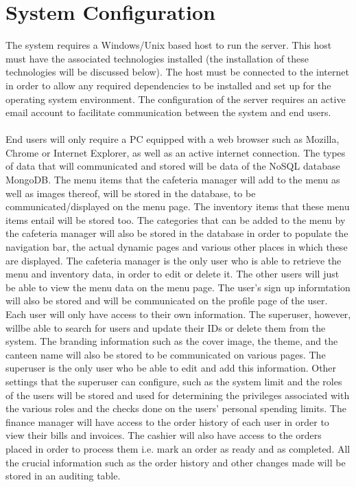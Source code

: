\documentclass[a4paper,12pt]{report}
\begin{document}
\section{System Configuration}
The system requires a Windows/Unix based host to run the server. This host must have the associated technologies installed (the installation of these technologies will be discussed below). The host must be connected to the internet in order to allow any required dependencies to be installed and set up for the operating system environment. The configuration of the server requires an active email account to facilitate communication between the system and end users. \\ 
\\
End users will only require a PC equipped with a web browser such as Mozilla, Chrome or Internet Explorer, as well as an active internet connection. The types of data that will communicated and stored will be data of the NoSQL database MongoDB. The menu items that the cafeteria manager will add to the menu as well as images thereof, will be stored in the database, to be communicated/displayed on the menu page. The inventory items that these menu items entail will be stored too. The categories that can be added to the menu by the cafeteria manager will also be stored in the database in order to populate the navigation bar, the actual dynamic pages and various other places in which these are displayed. The cafeteria manager is the only user who is able to retrieve the menu and inventory data, in order to edit or delete it. The other users will just be able to view the menu data on the menu page. The user's sign up informtation will also be stored and will be communicated on the profile page of the user. Each user will only have access to their own information. The superuser, however, willbe able to search for users and update their IDs or delete them from the system. The branding information such as the cover image, the theme, and the canteen name will also be  stored to be communicated on various pages. The superuser is the only user who be able to edit and add this information. Other settings that the superuser can configure, such as the system limit and the roles of the users will be stored and used for determining the privileges associated with the various roles and the checks done on the users' personal spending limits. The finance manager will have access to the order history of each user in order to view their bills and invoices. The cashier will also have access to the orders placed in order to process them i.e. mark an order as ready and as completed. All the crucial information such as the order history and other changes made will be stored in an auditing table.
\end{document}
